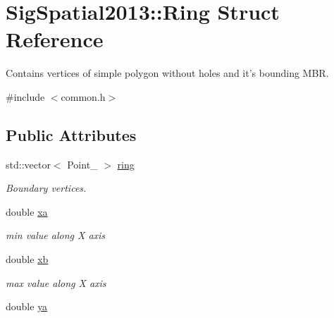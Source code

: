 \hypertarget{structSigSpatial2013_1_1Ring}{\section{Sig\-Spatial2013\-:\-:Ring Struct Reference}
\label{structSigSpatial2013_1_1Ring}
}


Contains vertices of simple polygon without holes and it's bounding M\-B\-R.  




{\ttfamily \#include $<$common.\-h$>$}

\subsection*{Public Attributes}
\begin{DoxyCompactItemize}
\item 
\hypertarget{structSigSpatial2013_1_1Ring_a10e38ba5e6a6d2a1f6a2b1ac1d942e31}{std\-::vector$<$ Point\-\_ $>$ \hyperlink{structSigSpatial2013_1_1Ring_a10e38ba5e6a6d2a1f6a2b1ac1d942e31}{ring}}\label{structSigSpatial2013_1_1Ring_a10e38ba5e6a6d2a1f6a2b1ac1d942e31}

\begin{DoxyCompactList}\small\item\em Boundary vertices. \end{DoxyCompactList}\item 
\hypertarget{structSigSpatial2013_1_1Ring_aa6a8cc573c74df27505e2782e9056b9e}{double \hyperlink{structSigSpatial2013_1_1Ring_aa6a8cc573c74df27505e2782e9056b9e}{xa}}\label{structSigSpatial2013_1_1Ring_aa6a8cc573c74df27505e2782e9056b9e}

\begin{DoxyCompactList}\small\item\em min value along X axis \end{DoxyCompactList}\item 
\hypertarget{structSigSpatial2013_1_1Ring_a55f499353ed248f49a6de987dcb790f2}{double \hyperlink{structSigSpatial2013_1_1Ring_a55f499353ed248f49a6de987dcb790f2}{xb}}\label{structSigSpatial2013_1_1Ring_a55f499353ed248f49a6de987dcb790f2}

\begin{DoxyCompactList}\small\item\em max value along X axis \end{DoxyCompactList}\item 
\hypertarget{structSigSpatial2013_1_1Ring_a9de85ffa601a418c01df7f7c1359dce0}{double \hyperlink{structSigSpatial2013_1_1Ring_a9de85ffa601a418c01df7f7c1359dce0}{ya}}\label{structSigSpatial2013_1_1Ring_a9de85ffa601a418c01df7f7c1359dce0}


\end{DoxyCompactItemize}
